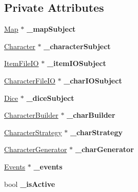 \subsection*{Private Attributes}
\begin{DoxyCompactItemize}
\item 
\hypertarget{class_game_logger_a26229b44c7769b5d4da7ee0a94562ddf}{}\label{class_game_logger_a26229b44c7769b5d4da7ee0a94562ddf} 
\hyperlink{class_map}{Map} $\ast$ {\bfseries \+\_\+map\+Subject}
\item 
\hypertarget{class_game_logger_a36b1b29903590bae935bc817c2272de0}{}\label{class_game_logger_a36b1b29903590bae935bc817c2272de0} 
\hyperlink{class_character}{Character} $\ast$ {\bfseries \+\_\+character\+Subject}
\item 
\hypertarget{class_game_logger_abc8f34e7a84053c1663a6a7cf3d1d30f}{}\label{class_game_logger_abc8f34e7a84053c1663a6a7cf3d1d30f} 
\hyperlink{class_item_file_i_o}{Item\+File\+IO} $\ast$ {\bfseries \+\_\+item\+I\+O\+Subject}
\item 
\hypertarget{class_game_logger_a8f03fbc059034832fc8de03ae114df00}{}\label{class_game_logger_a8f03fbc059034832fc8de03ae114df00} 
\hyperlink{class_character_file_i_o}{Character\+File\+IO} $\ast$ {\bfseries \+\_\+char\+I\+O\+Subject}
\item 
\hypertarget{class_game_logger_a290b62edd3c680734388a432d4c5443d}{}\label{class_game_logger_a290b62edd3c680734388a432d4c5443d} 
\hyperlink{class_dice}{Dice} $\ast$ {\bfseries \+\_\+dice\+Subject}
\item 
\hypertarget{class_game_logger_ae008b20643a646a8bbf7b4f2b3f09665}{}\label{class_game_logger_ae008b20643a646a8bbf7b4f2b3f09665} 
\hyperlink{class_character_builder}{Character\+Builder} $\ast$ {\bfseries \+\_\+char\+Builder}
\item 
\hypertarget{class_game_logger_ac7ad90b711cd91c3a96e8b36787c0249}{}\label{class_game_logger_ac7ad90b711cd91c3a96e8b36787c0249} 
\hyperlink{class_character_strategy}{Character\+Strategy} $\ast$ {\bfseries \+\_\+char\+Strategy}
\item 
\hypertarget{class_game_logger_afbc20417145d65905a3d3488d5e732b8}{}\label{class_game_logger_afbc20417145d65905a3d3488d5e732b8} 
\hyperlink{class_character_generator}{Character\+Generator} $\ast$ {\bfseries \+\_\+char\+Generator}
\item 
\hypertarget{class_game_logger_a973a477d050b2c1b78c1d99ebd6cd19a}{}\label{class_game_logger_a973a477d050b2c1b78c1d99ebd6cd19a} 
\hyperlink{class_events}{Events} $\ast$ {\bfseries \+\_\+events}
\item 
\hypertarget{class_game_logger_a51b46b1fdd6ec7e100bc091bed7cee45}{}\label{class_game_logger_a51b46b1fdd6ec7e100bc091bed7cee45} 
bool {\bfseries \+\_\+is\+Active}
\end{DoxyCompactItemize}


